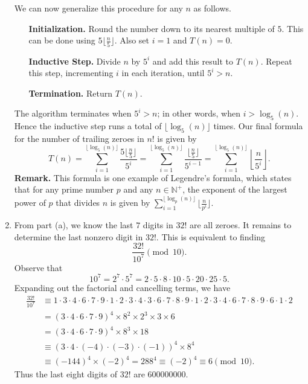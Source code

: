\documentclass{article}
\begin{document}
\begin{enumerate}
        \vspace{1.5mm}
        We can now generalize this procedure for any $n$ as follows.
        \begin{enumerate}[leftmargin=1.2in]
            \item [\textbf{Initialization.}] Round the number down to its nearest multiple of $5$. This can be done using $5\lfloor\frac{n}{5}\rfloor$. Also set $i = 1$ and $T(n) = 0$.
            \item [\textbf{Inductive Step.}] Divide $n$ by $5^{i}$ and add this result to $T(n)$. Repeat this step, incrementing $i$ in each iteration, until $5^{i} > n$.
            \item [\textbf{Termination.}] Return $T(n)$.
        \end{enumerate}
        The algorithm terminates when $5^{i} > n$; in other words, when $i > \log_{5}(n)$. Hence the inductive step runs a total of $\lfloor\log_{5}(n)\rfloor$ times. Our final formula for the number of trailing zeroes in $n!$ is given by $$T(n) = \sum_{i = 1}^{\lfloor\log_{5}(n)\rfloor} \frac{5\lfloor\frac{n}{5}\rfloor}{5^{i}} = \sum_{i = 1}^{\lfloor\log_{5}(n)\rfloor} \frac{\lfloor\frac{n}{5}\rfloor}{5^{i - 1}} = \sum_{i = 1}^{\lfloor\log_{5}(n)\rfloor} \left\lfloor\frac{n}{5^{i}}\right\rfloor.$$
        \textbf{Remark.} This formula is one example of Legendre's formula, which states that for any prime number $p$ and any $n \in \mathbb{N}^{+}$, the exponent of the largest power of $p$ that divides $n$ is given by $\sum_{i = 1}^{\lfloor \log_{p}(n) \rfloor} \lfloor \frac{n}{p^{i}} \rfloor$.
        \item From part (a), we know the last $7$ digits in $32!$ are all zeroes. It remains to determine the last nonzero digit in $32!$. This is equivalent to finding $$\frac{32!}{10^{7}} \pmod{10}.$$ Observe that $$10^{7} = 2^{7} \cdot 5^{7} = 2 \cdot 5 \cdot 8 \cdot 10 \cdot 5 \cdot 20 \cdot 25 \cdot 5.$$
        Expanding out the factorial and cancelling terms, we have
        \begin{align*}
            \frac{32!}{10^{7}} &\equiv 1 \cdot 3 \cdot 4 \cdot 6 \cdot 7 \cdot 9 \cdot 1 \cdot 2 \cdot 3 \cdot 4 \cdot 3 \cdot 6 \cdot 7 \cdot 8 \cdot 9 \cdot 1 \cdot 2 \cdot 3 \cdot 4 \cdot 6 \cdot 7 \cdot 8 \cdot 9 \cdot 6 \cdot 1 \cdot 2 \\
            &= (3 \cdot 4 \cdot 6 \cdot 7 \cdot 9)^{4} \times 8^{2} \times 2^{3} \times 3 \times 6 \\
            &= (3 \cdot 4 \cdot 6 \cdot 7 \cdot 9)^{4} \times 8^{3} \times 18 \\
            &\equiv (3 \cdot 4 \cdot (-4) \cdot (-3) \cdot (-1))^{4} \times 8^{4} \\
            &\equiv (-144)^{4} \times (-2)^{4} = 288^{4} \equiv (-2)^{4} \equiv 6 \pmod{10}.
        \end{align*}
        Thus the last eight digits of $32!$ are 600000000.
    
    \end{enumerate}
\end{document}
